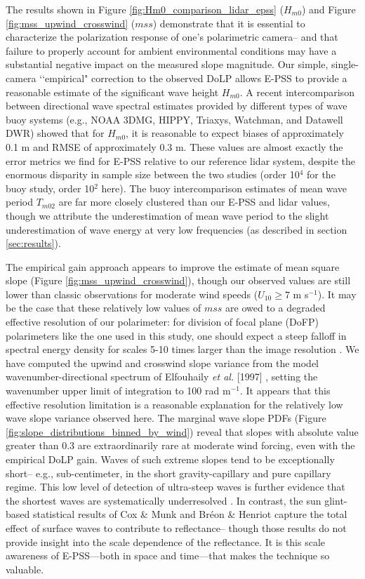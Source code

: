 \documentclass[letterpaper,journal]{IEEEtran}
\begin{document}
The results shown in Figure \ref{fig:Hm0_comparison_lidar_epss} ($H_{m0}$) and Figure \ref{fig:mss_upwind_crosswind} ($mss$) demonstrate that it is essential to characterize the polarization response of one's polarimetric camera-- and that failure to properly account for ambient environmental conditions may have a substantial negative impact on the measured slope magnitude. Our simple, single-camera \lq\lq empirical" correction to the observed DoLP allows E-PSS to provide a reasonable estimate of the significant wave height $H_{m0}$. A recent intercomparison \cite{jensen_quantifying_2021} between directional wave spectral estimates provided by different types of wave buoy systems (e.g., NOAA 3DMG, HIPPY, Triaxys, Watchman, and Datawell DWR) showed that for $H_{m0}$, it is reasonable to expect biases of approximately 0.1 m and RMSE of approximately 0.3 m. These values are almost exactly the error metrics we find for E-PSS relative to our reference lidar system, despite the enormous disparity in sample size between the two studies (order 10$^4$ for the buoy study, order 10$^2$ here). The buoy intercomparison estimates of mean wave period $T_{m02}$ are far more closely clustered than our E-PSS and lidar values, though we attribute the underestimation of mean wave period to the slight underestimation of wave energy at very low frequencies (as described in section \ref{sec:results}).

The empirical gain approach appears to improve the estimate of mean square slope (Figure \ref{fig:mss_upwind_crosswind}), though our observed values are still lower than classic observations \cite{Cox1954a,Breon2006} for moderate wind speeds ($U_{10}\geq7$ m s$^{-1}$). It may be the case that these relatively low values of $mss$ are owed to a degraded effective resolution of our polarimeter: for division of focal plane (DoFP) polarimeters like the one used in this study, one should expect a steep falloff in spectral energy density for scales 5-10 times larger than the image resolution \cite{laxague_effects_2025}. We have computed the upwind and crosswind slope variance from the model wavenumber-directional spectrum of Elfouhaily \emph{et al.} [1997] \cite{Elfouhaily1997}, setting the wavenumber upper limit of integration to 100 rad m$^{-1}$. It appears that this effective resolution limitation \cite{laxague_effects_2025} is a reasonable explanation for the relatively low wave slope variance observed here. The marginal wave slope PDFs (Figure \ref{fig:slope_distributions_binned_by_wind}) reveal that slopes with absolute value greater than 0.3 are extraordinarily rare at moderate wind forcing, even with the empirical DoLP gain. Waves of such extreme slopes tend to be exceptionally short-- e.g., sub-centimeter, in the short gravity-capillary and pure capillary regime. This low level of detection of ultra-steep waves is further evidence that the shortest waves are systematically underresolved \cite{laxague_effects_2025}. In contrast, the sun glint-based statistical results of Cox \& Munk and Br\'eon \& Henriot capture the total effect of surface waves to contribute to reflectance-- though those results do not provide insight into the scale dependence of the reflectance. It is this scale awareness of E-PSS---both in space and time---that makes the technique so valuable.
\end{document}
